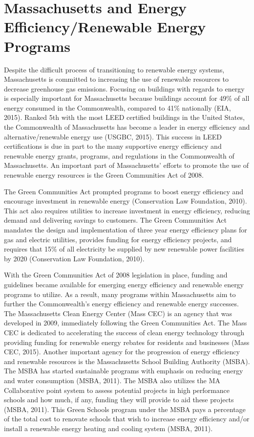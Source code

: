   \section{Massachusetts and Energy Efficiency/Renewable Energy Programs}
  \par Despite the difficult process of transitioning to renewable energy systems, Massachusetts is committed to increasing the use of renewable resources to decrease greenhouse gas emissions. Focusing on buildings with regards to energy is especially important for Massachusetts because buildings account for 49\% of all energy consumed in the Commonwealth, compared to 41\% nationally (EIA, 2015). Ranked 5th with the most LEED certified buildings in the United States, the Commonwealth of Massachusetts has become a leader in energy efficiency and alternative/renewable energy use (USGBC, 2015). This success in LEED certifications is due in part to the many supportive energy efficiency and renewable energy grants, programs, and regulations in the Commonwealth of Massachusetts. An important part of Massachusetts' efforts to promote the use of renewable energy resources is the Green Communities Act of 2008.
  \par The Green Communities Act prompted programs to boost energy efficiency and encourage investment in renewable energy (Conservation Law Foundation, 2010). This act also requires utilities to increase investment in energy efficiency, reducing demand and delivering savings to customers. The Green Communities Act mandates the design and implementation of three year energy efficiency plans for gas and electric utilities, provides funding for energy efficiency projects, and requires that 15\% of all electricity be supplied by new renewable power facilities by 2020  (Conservation Law Foundation, 2010).
  \par With the Green Communities Act of 2008 legislation in place, funding and guidelines became available for emerging energy efficiency and renewable energy programs to utilize. As a result, many programs within Massachusetts aim to further the Commonwealth's energy efficiency and renewable energy successes. The Massachusetts Clean Energy Center (Mass CEC) is an agency that was developed in 2009, immediately following the Green Communities Act. The Mass CEC  is dedicated to accelerating the success of clean energy technology through providing funding for renewable energy rebates for residents and businesses (Mass CEC, 2015). Another important agency for the progression of energy efficiency and renewable resources is the Massachusetts School Building Authority (MSBA). The MSBA has started sustainable programs with emphasis on reducing energy and water consumption (MSBA, 2011). The MSBA also utilizes the MA Collaborative point system to assess potential projects in high performance schools and how much, if any, funding they will provide to aid these projects (MSBA, 2011). This Green Schools program under the MSBA pays a percentage of the total cost to renovate schools that wish to increase energy efficiency and/or install a renewable energy heating and cooling system (MSBA, 2011).

